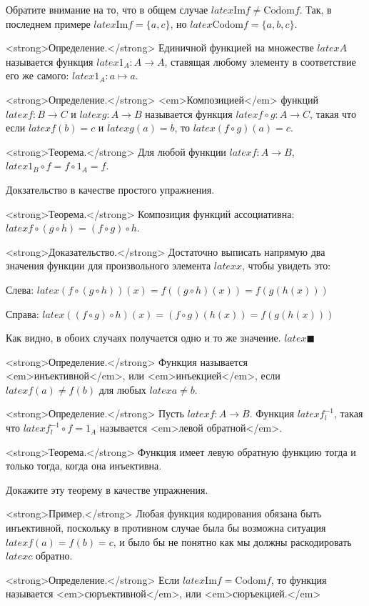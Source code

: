 Обратите внимание на то, что в общем случае $latex \mathrm{Im} f \not= \mathrm{Codom} f$. Так, в последнем примере $latex \mathrm{Im} f = \{a, c\}$, но $latex \mathrm{Codom}f = \{a, b, c\}$.

<strong>Определение.</strong> Единичной функцией на множестве $latex A$ называется функция $latex 1_A: A\to A$, ставящая любому элементу в соответствие его же самого: $latex 1_A: a\mapsto a$.

<strong>Определение.</strong> <em>Композицией</em> функций $latex f:B\to C$ и $latex g:A\to B$ называется функция $latex f\circ g: A\to C$, такая что если $latex f(b) = c$ и $latex g(a) = b$, то $latex (f\circ g)(a) = c$.

<strong>Теорема.</strong> Для любой функции $latex f: A\to B$, $latex 1_B \circ f = f \circ 1_A = f$.

Докзательство в качестве простого упражнения.

<strong>Теорема.</strong> Композиция функций ассоциативна: $latex f\circ (g \circ h) = (f\circ g)\circ h$.

<strong>Доказательство.</strong> Достаточно выписать напрямую два значения функции для произвольного элемента $latex x$, чтобы увидеть это:

Слева: $latex (f\circ (g \circ h)) (x) = f((g\circ h)(x)) = f(g(h(x)))$

Справа: $latex ((f\circ g) \circ h) (x) = (f\circ g)(h(x)) = f(g(h(x)))$

Как видно, в обоих случаях получается одно и то же значение. $latex \blacksquare$

<strong>Определение.</strong> Функция называется <em>инъективной</em>, или <em>инъекцией</em>, если $latex f(a)\not= f(b)$ для любых $latex a\not= b$.

<strong>Определение.</strong> Пусть $latex f:A\to B$. Функция $latex f^{-1}_l$, такая что $latex f^{-1}_l\circ f = 1_A$ называется <em>левой обратной</em>.

<strong>Теорема.</strong> Функция имеет левую обратную функцию тогда и только тогда, когда она инъективна.

Докажите эту теорему в качестве упражнения.

<strong>Пример.</strong> Любая функция кодирования обязана быть инъективной, поскольку в противном случае была бы возможна ситуация $latex f(a) = f(b) = c$, и было бы не понятно как мы должны раскодировать $latex c$ обратно.

<strong>Определение.</strong> Если $latex \mathrm{Im}f = \mathrm{Codom}f$, то функция называется <em>сюръективной</em>, или <em>сюръекцией.</em>

